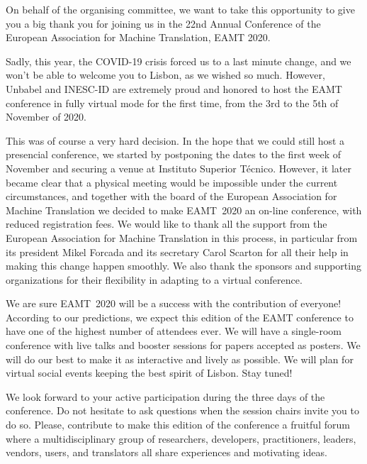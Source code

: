\documentclass[a4paper,11pt,twoside]{book}
\begin{document}
On behalf of the organising committee, we want to take this opportunity to give you a big thank you for joining us in the 22nd Annual Conference of the European Association for Machine Translation, EAMT 2020. 

Sadly, this year, the COVID-19 crisis forced us to a last minute change, and we won’t be able to welcome you to Lisbon, as we wished so much. However, Unbabel and INESC-ID are extremely proud and honored to host the EAMT conference in fully virtual mode for the first time, from the 3rd to the 5th of November of 2020. 

This was of course a very hard decision. In the hope that we could still host a presencial conference, we started by postponing the dates to the first week of November and securing a venue at Instituto Superior Técnico. However, it later became clear that a physical meeting would be impossible under the current circumstances, and together with the board of the European Association for Machine Translation we decided to make EAMT~2020 an on-line conference, with reduced registration fees. We would like to thank all the support from the European Association for Machine Translation in this process, in particular from its president Mikel Forcada and its secretary Carol Scarton for all their help in making this change happen smoothly. We also thank the sponsors and supporting organizations for their flexibility in adapting to a virtual conference.

We are sure EAMT~2020 will be a success with the contribution of everyone! According to our predictions, we expect this edition of the EAMT conference to have one of the highest number of attendees ever. We will have a single-room conference with live talks and booster sessions for papers accepted as posters. We will do our best to make it as interactive and lively as possible. We will plan for virtual social events keeping the best spirit of Lisbon. Stay tuned!

We look forward to your active participation during the three days of the conference. Do not hesitate to ask questions when the session chairs invite you to do so. Please, contribute to make this edition of the conference a fruitful forum where a multidisciplinary group of researchers, developers, practitioners, leaders, vendors, users, and translators all share experiences and motivating ideas.
\end{document}
